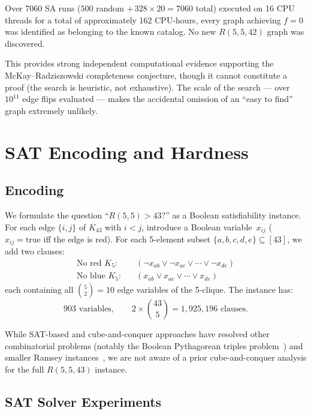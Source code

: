 \documentclass[11pt,a4paper]{article}
\theoremstyle{definition}
\theoremstyle{remark}
\newcommand{\Kn}[1]{K_{#1}}
\newcommand{\Rset}[3]{R(#1,#2,#3)}
\begin{document}
Over 7060 SA runs ($500$ random $+ \, 328 \times 20
= 7060$ total) executed on 16 CPU threads for a total of
approximately 162 CPU-hours, every graph achieving $f = 0$ was identified
as belonging to the known catalog.  No new $\Rset{5}{5}{42}$ graph
was discovered.

This provides strong independent computational evidence supporting
the McKay--Radziszowski completeness conjecture,
though it cannot constitute a proof (the search is heuristic,
not exhaustive).  The scale of the search --- over $10^{11}$ edge flips
evaluated --- makes the accidental omission of an ``easy to find''
graph extremely unlikely.

\section{SAT Encoding and Hardness}
\label{sec:sat}

\subsection{Encoding}

We formulate the question ``$R(5,5) > 43$?'' as a Boolean
satisfiability instance.  For each edge $\{i,j\}$ of $\Kn{43}$
with $i < j$, introduce a Boolean variable~$x_{ij}$
($x_{ij} = \text{true}$ iff the edge is red).
For each 5-element subset $\{a,b,c,d,e\} \subseteq [43]$,
we add two clauses:
\begin{align}
  \text{No red $K_5$:}\quad
    &(\neg x_{ab} \lor \neg x_{ac} \lor \cdots \lor \neg x_{de})
    \label{eq:nored} \\
  \text{No blue $K_5$:}\quad
    &(x_{ab} \lor x_{ac} \lor \cdots \lor x_{de})
    \label{eq:noblue}
\end{align}
each containing all $\binom{5}{2} = 10$ edge variables of the
5-clique.  The instance has:
\[
  \text{903 variables}, \qquad
  2 \times \binom{43}{5} = 1{,}925{,}196 \text{ clauses}.
\]

While SAT-based and cube-and-conquer approaches have resolved
other combinatorial problems (notably the Boolean Pythagorean
triples problem~\cite{HeulePyth2016}) and smaller Ramsey
instances~\cite{HeuleCnC}, we are not aware of a prior
cube-and-conquer analysis for the full $R(5,5,43)$ instance.

\subsection{SAT Solver Experiments}
\end{document}
